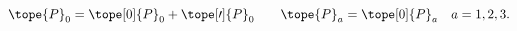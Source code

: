 \begin{equation}	\label{12.7}
\tope{P}_0
=
\tope[0]{P}_0 + \tope[\prime]{P}_0
\qquad
\tope{P}_a  = \tope[0]{P}_a	\quad   a=1,2,3 .
	\end{equation}

